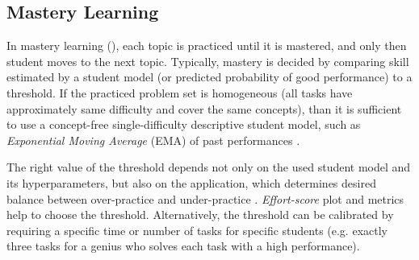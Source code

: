 \subsection{Mastery Learning}
\label{sec:mastery-learning}

In mastery learning (\cite{mastery-learning-scale}), each topic
is practiced until it is mastered, and only then student moves
to the next topic.  %
Typically, mastery is decided by comparing skill estimated by a student model
(or predicted probability of good performance) to a threshold. %
If the practiced problem set is homogeneous (all tasks have approximately same difficulty
and cover the same concepts), than it is sufficient to use a concept-free
single-difficulty descriptive student model,  %
such as \emph{Exponential Moving Average} (EMA) of past performances
\cite{alg.mastery}.

The right value of the threshold depends not only on the used student model and
its hyperparameters, but also on the application, which determines desired
balance between over-practice and under-practice \cite{mastery-evaluation-model}.
\emph{Effort-score} plot and metrics
\cite{alg.mastery, evaluation-leopard, learner-models-integration-skills} %
help to choose the threshold.
Alternatively, the threshold can be calibrated by requiring a specific time or
number of tasks for specific students (e.g. exactly three tasks for a genius who
solves each task with a high performance). %


